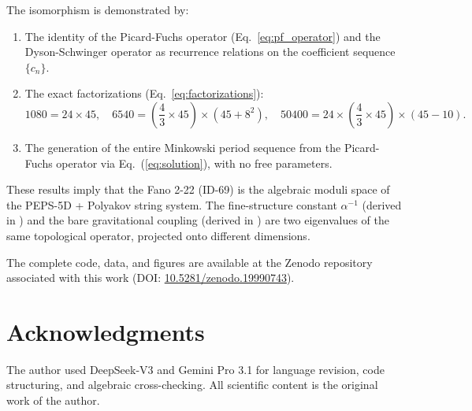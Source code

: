 \documentclass[12pt]{article}
\begin{document}
The isomorphism is demonstrated by:

\begin{enumerate}
  \item The identity of the Picard-Fuchs operator (Eq.~\ref{eq:pf_operator})
        and the Dyson-Schwinger operator as recurrence relations on the
        coefficient sequence $\{c_n\}$.
  \item The exact factorizations (Eq.~\ref{eq:factorizations}):
        \[
        1080 = 24 \times 45,\quad
        6540 = \left(\frac{4}{3}\times 45\right)\times\left(45+8^2\right),\quad
        50400 = 24 \times \left(\frac{4}{3}\times 45\right) \times \left(45-10\right).
        \]
  \item The generation of the entire Minkowski period sequence from the
        Picard-Fuchs operator via Eq.~(\ref{eq:solution}), with no free
        parameters.
\end{enumerate}

These results imply that the Fano 2-22 (ID-69) is the algebraic moduli space
of the PEPS-5D + Polyakov string system. The fine-structure constant
$\alpha^{-1}$ (derived in \cite{alpha_series}) and the bare gravitational
coupling (derived in \cite{peps5d}) are two eigenvalues of the same topological
operator, projected onto different dimensions.

The complete code, data, and figures are available at the Zenodo repository
associated with this work (DOI: \href{https://doi.org/10.5281/zenodo.19990743}{10.5281/zenodo.19990743}).

\section*{Acknowledgments}

The author used DeepSeek-V3 and Gemini Pro 3.1 for language revision,
code structuring, and algebraic cross-checking. All scientific content is
the original work of the author.
\end{document}
